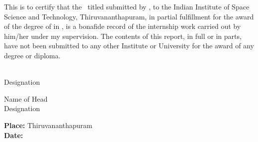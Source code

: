 This is to certify that the \Doctype\  titled \textbf{\Title} 
submitted by {\bf\Author}, to the Indian Institute of Space Science 
and Technology, Thiruvananthapuram, in partial fulfillment for the 
award of the degree of {\bf\Degreetext} in { \bf\Specialization}, is 
a bonafide record of the internship work carried out by him/her 
under my supervision. The contents of this report, in full or in 
parts, have not been submitted to any other Institute or University 
for the award of any degree or diploma. 

\vspace{35mm}
\noindent
\begin{minipage}{0.5\textwidth}
\Advisor\\
Designation
\end{minipage}
\hspace{35mm}
\begin{minipage}{0.5\textwidth}
\raggedright{Name of Head}\\
Designation
\end{minipage}

\vspace{30mm}
\noindent
\textbf{Place: }Thiruvananthapuram\\
\textbf{Date: \ }\Date


